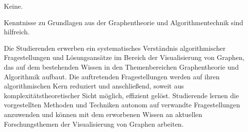\begin{course}

\setdoclanguagegerman
{}



\coursehead


\label{cour_5825.dp_997}


\begin{styleenv}
\begin{assessment}

\end{assessment}

\begin{conditions}Keine.\end{conditions}

\begin{recommendations}Kenntnisse zu Grundlagen aus der Graphentheorie und Algorithmentechnik sind hilfreich.

\end{recommendations}
\end{styleenv}

\begin{learningoutcomes}
Die Studierenden erwerben ein systematisches Verständnis algorithmischer Fragestellungen und Lösungsansätze im Bereich der Visualisierung von Graphen, das auf dem bestehenden Wissen in den Themenbereichen Graphentheorie und Algorithmik aufbaut. Die auftretenden Fragestellungen werden auf ihren algorithmischen Kern reduziert und anschließend, soweit aus komplexitätstheoretischer Sicht möglich, effizient gelöst. Studierende lernen die vorgestellten Methoden und Techniken autonom auf verwandte Fragestellungen anzuwenden und können mit dem erworbenen Wissen an aktuellen Forschungsthemen der Visualisierung von Graphen arbeiten.


\end{learningoutcomes}


\end{course}
